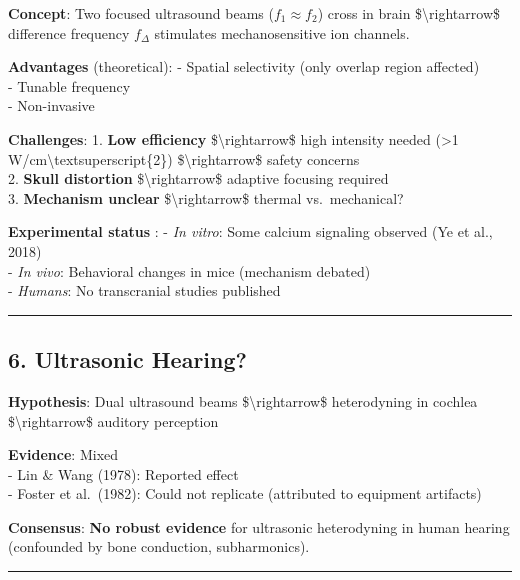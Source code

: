 \textbf{Concept}: Two focused ultrasound beams (\(f_1 \approx f_2\))
cross in brain \$\textbackslash rightarrow\$ difference frequency
\(f_\Delta\) stimulates mechanosensitive ion channels.

\textbf{Advantages} (theoretical): - Spatial selectivity (only overlap
region affected)\\
- Tunable frequency\\
- Non-invasive

\textbf{Challenges}: 1. \textbf{Low efficiency}
\$\textbackslash rightarrow\$ high intensity needed (\textgreater1
W/cm\textbackslash textsuperscript\{2\}) \$\textbackslash rightarrow\$
safety concerns\\
2. \textbf{Skull distortion} \$\textbackslash rightarrow\$ adaptive
focusing required\\
3. \textbf{Mechanism unclear} \$\textbackslash rightarrow\$ thermal
vs.~mechanical?

\textbf{Experimental status} : - \emph{In vitro}: Some calcium signaling
observed (Ye et al., 2018)\\
- \emph{In vivo}: Behavioral changes in mice (mechanism debated)\\
- \emph{Humans}: No transcranial studies published

\begin{center}\rule{0.5\linewidth}{0.5pt}\end{center}

\subsection{\texorpdfstring{6. Ultrasonic Hearing?
}{6. Ultrasonic Hearing? }}\label{ultrasonic-hearing}

\textbf{Hypothesis}: Dual ultrasound beams \$\textbackslash rightarrow\$
heterodyning in cochlea \$\textbackslash rightarrow\$ auditory
perception

\textbf{Evidence}: Mixed\\
- Lin \& Wang (1978): Reported effect\\
- Foster et al.~(1982): Could not replicate (attributed to equipment
artifacts)

\textbf{Consensus}: \textbf{No robust evidence} for ultrasonic
heterodyning in human hearing (confounded by bone conduction,
subharmonics).

\begin{center}\rule{0.5\linewidth}{0.5pt}\end{center}

